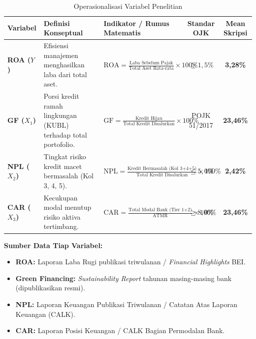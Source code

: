 \documentclass[11pt,a4paper]{article}
\begin{document}
\begin{table}[htbp]
\centering
\small
\renewcommand{\arraystretch}{1.3}
\caption{Operasionalisasi Variabel Penelitian}
\begin{tabularx}{\textwidth}{l p{3.2cm} X c c}
\toprule
\rowcolor{tableHeaderBg}
\textbf{Variabel} & \textbf{Definisi Konseptual} & \textbf{Indikator / Rumus Matematis} & \textbf{Standar OJK} & \textbf{Mean Skripsi} \\
\midrule
\textbf{ROA ($Y$)} & Efisiensi manajemen menghasilkan laba dari total aset. & $\displaystyle \text{ROA} = \frac{\text{Laba Sebelum Pajak}}{\text{Total Aset Rata-rata}} \times 100\%$ & $\ge 1{,}5\%$ & \textbf{3,28\%} \\
\midrule
\textbf{GF ($X_1$)} & Porsi kredit ramah lingkungan (KUBL) terhadap total portofolio. & $\displaystyle \text{GF} = \frac{\text{Kredit Hijau}}{\text{Total Kredit Disalurkan}} \times 100\%$ & POJK 51/2017 & \textbf{23,46\%} \\
\midrule
\textbf{NPL ($X_2$)} & Tingkat risiko kredit macet bermasalah (Kol 3, 4, 5). & $\displaystyle \text{NPL} = \frac{\text{Kredit Bermasalah (Kol 3+4+5)}}{\text{Total Kredit Disalurkan}} \times 100\%$ & $\le 5{,}0\%$ & \textbf{2,42\%} \\
\midrule
\textbf{CAR ($X_3$)} & Kecukupan modal menutup risiko aktiva tertimbang. & $\displaystyle \text{CAR} = \frac{\text{Total Modal Bank (Tier 1+2)}}{\text{ATMR}} \times 100\%$ & $\ge 8{,}0\%$ & \textbf{23,46\%} \\
\bottomrule
\end{tabularx}
\end{table}

\textbf{Sumber Data Tiap Variabel:}
\begin{itemize}
    \item \textbf{ROA:} Laporan Laba Rugi publikasi triwulanan / \textit{Financial Highlights} BEI.
    \item \textbf{Green Financing:} \textit{Sustainability Report} tahunan masing-masing bank (dipublikasikan resmi).
    \item \textbf{NPL:} Laporan Keuangan Publikasi Triwulanan / Catatan Atas Laporan Keuangan (CALK).
    \item \textbf{CAR:} Laporan Posisi Keuangan / CALK Bagian Permodalan Bank.
\end{itemize}

\end{document}
